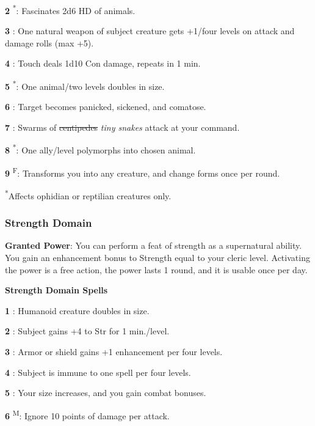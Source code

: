 \textbf{2} \textsuperscript{*}: Fascinates 2d6 HD of animals.

\textbf{3} : One natural weapon of subject creature gets +1/four levels on attack and damage rolls (max +5).

\textbf{4} : Touch deals 1d10 Con damage, repeats in 1 min.

\textbf{5} \textsuperscript{*}: One animal/two levels doubles in size.

\textbf{6} : Target becomes panicked, sickened, and comatose.

\textbf{7} : Swarms of \sout{centipedes} \textit{tiny snakes} attack at your command.

\textbf{8} \textsuperscript{*}: One ally/level polymorphs into chosen animal.

\textbf{9} \textsuperscript{F}: Transforms you into any creature, and change forms once per round.

\textsuperscript{*}Affects ophidian or reptilian creatures only.

\subsubsection{Strength Domain}

\textbf{Granted Power}: You can perform a feat of strength as a supernatural ability. You gain an enhancement bonus to Strength equal to your cleric level. Activating the power is a free action, the power lasts 1 round, and it is usable once per day.

\textbf{Strength Domain Spells}

\textbf{1} : Humanoid creature doubles in size.

\textbf{2} : Subject gains +4 to Str for 1 min./level.

\textbf{3} : Armor or shield gains +1 enhancement per four levels.

\textbf{4} : Subject is immune to one spell per four levels.

\textbf{5} : Your size increases, and you gain combat bonuses.

\textbf{6} \textsuperscript{M}: Ignore 10 points of damage per attack.

